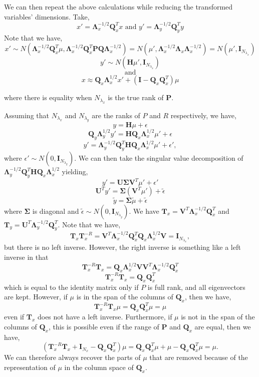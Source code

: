 \documentclass[11pt]{article} %
\newcommand{\mat}{\mathbf}
\begin{document}
We can then repeat the above calculations while reducing the
transformed variables' dimensions.
Take,
\[
  x' = \mat{\Lambda}_x^{-1/2} \mat{Q}_x^T x
  \text{ and }
  y' = \mat{\Lambda}_y^{-1/2} \mat{Q}_y^T y
\]
Note that we have,
\[
  x' \sim N(\mat{\Lambda}_x^{-1/2} \mat{Q}_x^T \mu,
  \mat{\Lambda}_x^{-1/2} \mat{Q}_x^T \mat{P} \mat{Q}
  \mat{\Lambda}_x^{-1/2})
  = N(\mu',
  \mat{\Lambda}_x^{-1/2} \mat{\Lambda}_x
  \mat{\Lambda}_x^{-1/2})
  = N(\mu', \mat{I}_{N_{\lambda_x}})
\]
\[
  y' \sim N(\mat{H} \mu', \mat{I}_{N_{\lambda_x}})
\]
\[
  \text{and}
\]
\[
  x \approx \mat{Q}_x \mat{\Lambda}_x^{1/2} x' + (\mat{I} - \mat{Q}_x \mat{Q}_x^T)\mu
\]

where there is equality when $N_{\lambda_x}$ is the
true rank of $\mat{P}$.

Assuming that $N_{\lambda_x}$ and $N_{\lambda_y}$ are the ranks of $P$
and $R$ respectively, we have,
\[
  y = \mat{H} \mu + \epsilon
\]
\[
  \mat{Q}_y \mat{\Lambda}_y^{1/2} y' = \mat{H}
  \mat{Q}_x \mat{\Lambda}_x^{1/2} \mu' + \epsilon
\]
\[
  y' = \mat{\Lambda}_y^{-1/2} \mat{Q}_y^T \mat{H}
  \mat{Q}_x \mat{\Lambda}_x^{1/2} \mu' + \epsilon',
\]
where $\epsilon' \sim N(0, \mat{I}_{N_{\lambda_y}})$.
We can then take the singular value decomposition of
$\mat{\Lambda}_y^{-1/2} \mat{Q}_y^T \mat{H} \mat{Q}_x
\mat{\Lambda}_x^{1/2}$ yielding,
\[
  y' = \mat{U} \mat{\Sigma} \mat{V}^{T} \mu' + \epsilon'
\]
\[
  \mat{U}^T y' = \mat{\Sigma} (\mat{V}^T \mu') + \tilde{\epsilon}
\]
\[
  \tilde{y}= \mat{\Sigma} \tilde{\mu} + \tilde{\epsilon}
\]
where $\mat{\Sigma}$ is diagonal and $\tilde{\epsilon} \sim N(0,
\mat{I}_{N_{\lambda_y}})$.
We have $\mat{T}_x = \mat{V}^T \mat{\Lambda}_x^{-1/2} \mat{Q}_x^T$ and
$\mat{T}_y = \mat{U}^T \mat{\Lambda}_y^{-1/2} \mat{Q}_y^T$.
Note that we have,
\[
  \mat{T}_x \mat{T}_x^{-R} = \mat{V}^T \mat{\Lambda}_x^{-1/2}
  \mat{Q}_x^T \mat{Q}_x \mat{\Lambda}_x^{1/2} \mat{V} = \mat{I}_{N_{\lambda_x}},
\]
but there is no left inverse.
However, the right inverse is something like a left inverse in that
\[
  \mat{T}_x^{-R} \mat{T}_x = \mat{Q}_x \mat{\Lambda}_x^{1/2} \mat{V}
  \mat{V}^T \mat{\Lambda}_x^{-1/2} \mat{Q}_x^T
\]
\[
  \mat{T}_x^{-R} \mat{T}_x = \mat{Q}_x \mat{Q}_x^T
\]
which is equal to the identity matrix only if $P$ is full rank, and
all eigenvectors are kept.
However, if $\mu$ is in the span of the columns of $\mat{Q}_x$, then
we have,
\[
  \mat{T}_x^{-R} \mat{T}_x \mu = \mat{Q}_x \mat{Q}_x^T \mu = \mu
\]
even if $\mat{T}_x$ does not have a left inverse.
Furthermore, if $\mu$ is not in the span of the columns of
$\mat{Q}_x$, this is possible even if the range of $\mat{P}$ and
$\mat{Q}_x$ are equal, then we have,
\[
  (\mat{T}_x^{-R} \mat{T}_x + \mat{I}_{N_x} - \mat{Q}_x \mat{Q}_x^T)
  \mu = \mat{Q}_x \mat{Q}_x^T \mu  + \mu - \mat{Q}_x \mat{Q}_x^T \mu =
  \mu.
\]
We can therefore always recover the parts of $\mu$ that are removed
because of the representation of $\mu$ in the column space of $\mat{Q}_x$.
\end{document}
